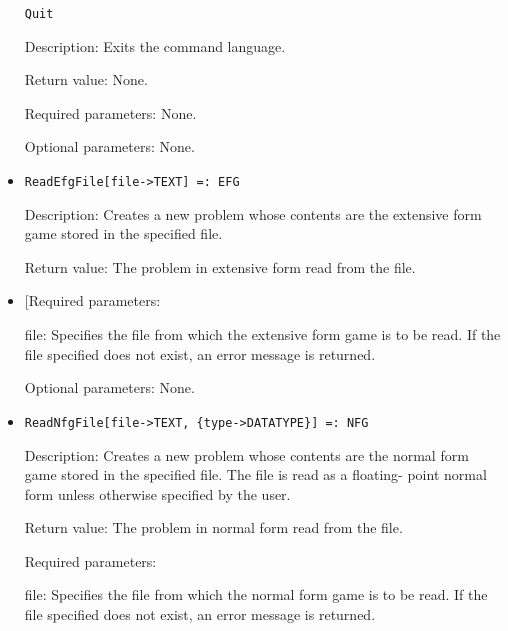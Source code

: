 \begin{itemize}

\protect \large \begin{verbatim}
Quit
\end{verbatim}\normalsize

\bd

\item
[Description:] Exits the command language.
\item
[Return value:] None.
\item
[Required parameters:] None.
\item
[Optional parameters:] None.
\ed


\item
\protect \large \begin{verbatim}
ReadEfgFile[file->TEXT] =: EFG
\end{verbatim}\normalsize

\bd
\item
[Description:] Creates a new problem whose contents are the extensive
form game stored in the specified file.
\item
[Return value:] The problem in extensive form read from the file.
\item

[Required parameters:

\bd
\item
[file:] Specifies the file from which the extensive form game is to be
read.  If the file specified does not exist, an error message is
returned.
\ed

\item
[Optional parameters:] None.
\ed

\item
\protect \large \begin{verbatim}
ReadNfgFile[file->TEXT, {type->DATATYPE}] =: NFG
\end{verbatim}\normalsize

\bd
\item
[Description:] Creates a new problem whose contents are the normal
form game stored in the specified file.  The file is read as a
floating- point normal form unless otherwise specified by the user.
\item
[Return value:] The problem in normal form read from the file.
\item
[Required parameters:]\hfil\null

\bd
\item
[file:] Specifies the file from which the normal form game is to be
read.  If the file specified does not exist, an error message is
returned.
\ed


\end{itemize}
